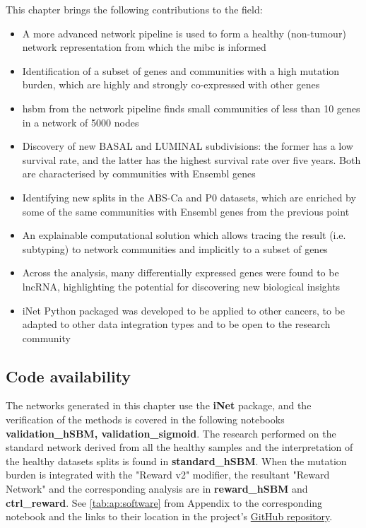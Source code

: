 This chapter brings the following contributions to the field:
\begin{itemize}
    \item A more advanced network pipeline is used to form a healthy (non-tumour) network representation from which the \acrshort{mibc} is informed
    \item Identification of a subset of genes and communities with a high mutation burden, which are highly and strongly co-expressed with other genes
    \item \acrlong{hsbm} from the network pipeline finds small communities of less than 10 genes in a network of 5000 nodes
    \item Discovery of new \gls{BASAL} and \gls{LUMINAL} subdivisions: the former has a low survival rate, and the latter has the highest survival rate over five years. Both are characterised by communities with Ensembl genes
    \item Identifying new splits in the ABS-Ca and P0 datasets, which are enriched by some of the same communities with Ensembl genes from the previous point 
    \item An explainable computational solution which allows tracing the result (i.e. subtyping) to network communities and implicitly to a subset of genes
    \item Across the analysis, many differentially expressed genes were found to be \acrlong{lncRNA}, highlighting the potential for discovering new biological insights
    \item iNet Python packaged was developed to be applied to other cancers, to be adapted to other data integration types and to be open to the research community
\end{itemize}

\subsection{Code availability} \label{s:N_II:implementation}

The networks generated in this chapter use the \textbf{iNet} package, and the verification of the methods is covered in the following notebooks \textbf{validation\_hSBM, validation\_sigmoid}. The research performed on the standard network derived from all the healthy samples and the interpretation of the healthy datasets splits is found in \textbf{standard\_hSBM}. When the mutation burden is integrated with the "Reward v2" modifier, the resultant "Reward Network" and the corresponding analysis are in \textbf{reward\_hSBM} and \textbf{ctrl\_reward}. See \cref{tab:ap:software} from Appendix to the corresponding notebook and the links to their location in the project's \href{https://github.com/vladUng/PhD_thesis_exp/}{GitHub repository}.

